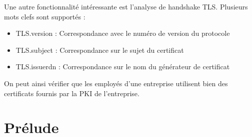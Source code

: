\documentclass[a4paper,11pt,french]{article}
\begin{document}
Une autre fonctionnalité intéressante est l’analyse de handshake TLS. Plusieurs mots clefs sont supportés :
\begin{itemize}
\item TLS.version : Correspondance avec le numéro de version du protocole
\item TLS.subject : Correspondance sur le sujet du certificat
\item TLS.issuerdn : Correspondance sur le nom du générateur de certificat
\end{itemize}

On peut ainsi vérifier que les employés d’une entreprise utilisent bien des certificats fournis par la PKI de l’entreprise. 


\section{Prélude}
\end{document}
